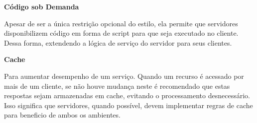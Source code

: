 \textbf{Código sob Demanda}

Apesar de ser a única restrição opcional do estilo, ela permite que servidores disponibilizem código em forma de script para que seja executado no cliente. Dessa forma, extendendo a lógica de serviço do servidor para seus clientes. \cite{Fielding2000}

\textbf{Cache}

Para aumentar desempenho de um serviço. Quando um recurso é acessado por mais de um cliente, se não houve mudança neste é recomendado que estas respostas sejam armazenadas em cache, evitando o processamento desnecessário. Isso significa que servidores, quando possível, devem implementar regras de cache para beneficio de ambos os ambientes. \cite{Fielding2000}

